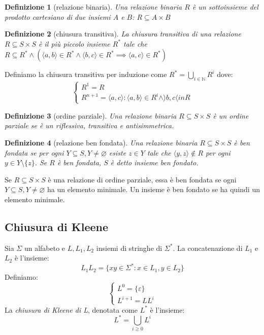 \documentclass[a4paper,titlepage]{article}
\newtheorem{definition}{Definizione}[section]
\theoremstyle{definition}
\newcommand{\N}{\mathbb{N}}
\begin{document}
\begin{definition}[relazione binaria]
	Una relazione binaria $R$ è un sottoinsieme del prodotto cartesiano di due insiemi $A$ e $B$: $R \subseteq A \times B$
\end{definition}

\begin{definition}[chiusura transitiva]
	La chiusura transitiva di una relazione  $R \subseteq S\times S $ è il più piccolo insieme $ R^{* }$ tale che $ R \subseteq R^{*} \wedge (\langle a, b \rangle \in R^{*} \wedge \langle b, c \rangle \in R^{*} \implies \langle a, c \rangle \in R^{*}) $
\end{definition}

Definiamo la chiusura transitiva per induzione come $R^* = \bigcup_{i \in\N} R^i$ dove:
\[
	\begin{cases}
		R^1 = R \\
		R^{n+1} = {\langle a, c \rangle : \langle a, b \rangle \in R^i \wedge \rangle b, c \langle in R}
	\end{cases}
\]

\begin{definition}[ordine parziale]
	Una relazione binaria $R\subseteq S\times S$ è un ordine parziale se è un riflessiva, transitiva e antisimmetrica. 
\end{definition}

\begin{definition}[relazione ben fondata]
	Una relazione binaria $R\subseteq S\times S$ è ben fondata se per ogni $Y\subseteq S, Y \neq\varnothing$ esiste $z\in Y$ tale che $\langle y, z \rangle\notin R$ per ogni $y\in Y\setminus \{z\}$. Se $R$ è ben fondata, $S$ è detto insieme ben fondato.
\end{definition}

Se $R\subseteq S\times S$ è una relazione di ordine parziale, essa è ben fondata se ogni $Y\subseteq S, Y\neq\varnothing$ ha un elemento minimale. Un insieme è ben fondato se ha quindi un elemento minimale. 

\subsection{Chiusura di Kleene}
Sia $\Sigma$ un alfabeto e $L,L_1,L_2$ insiemi di stringhe di $\Sigma^*$. La concatenazione di $L_1$ e $L_2$ è l'insieme: 
\[
	L_1 L_2 = \{xy\in\Sigma^*:x\in L_1, y\in L_2\}
\]
Definiamo: 
\[
	\begin{cases} 
		L^0=\{\varepsilon\}\\
		L^{i+1}=LL^i
	\end{cases}
\]
La \textit{chiusura di Kleene di L}, denotata come $L^*$ è l'insieme: 
\[
	L^*=\bigcup_{i\geq0}L^i
\]
\end{document}
